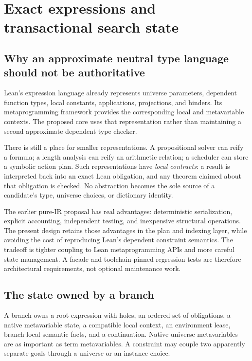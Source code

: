 \documentclass[11pt,letterpaper]{article}
\newcommand{\code}[1]{\texttt{\detokenize{#1}}}
\theoremstyle{definition}\newtheorem{definition}[theorem]{Definition}
\theoremstyle{remark}\newtheorem{remark}[theorem]{Remark}
\begin{document}
\section{Exact expressions and transactional search state}
\label{sec:state}

\subsection{Why an approximate neutral type language should not be authoritative}

Lean's expression language already represents universe parameters, dependent
function types, local constants, applications, projections, and binders. Its
metaprogramming framework provides the corresponding local and metavariable
contexts. The proposed core uses that representation rather than maintaining a
second approximate dependent type checker.\cite{metabook,applysource}

There is still a place for smaller representations. A propositional solver can
reify a formula; a length analysis can reify an arithmetic relation; a scheduler
can store a symbolic action plan. Such representations have \emph{local contracts}:
a result is interpreted back into an exact Lean obligation, and any theorem
claimed about that obligation is checked. No abstraction becomes the sole source
of a candidate's type, universe choices, or dictionary identity.

The earlier pure-IR proposal has real advantages: deterministic serialization,
explicit accounting, independent testing, and inexpensive structural operations.
The present design retains those advantages in the plan and indexing layer,
while avoiding the cost of reproducing Lean's dependent constraint semantics.
The tradeoff is tighter coupling to Lean metaprogramming APIs and more careful
state management. A \code{MetaCompat} facade and toolchain-pinned regression tests
are therefore architectural requirements, not optional maintenance work.

\subsection{The state owned by a branch}

A branch owns a root expression with holes, an ordered set of obligations, a
native metavariable state, a compatible local context, an environment lease,
branch-local semantic facts, and a continuation. Native universe metavariables
are as important as term metavariables. A constraint may couple two apparently
separate goals through a universe or an instance choice.
\end{document}

